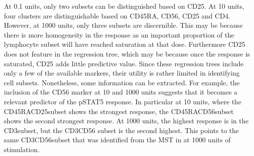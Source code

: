 At 0.1 units, only two subsets can be distinguished based on CD25.  
At 10 units, four clusters are distinguishable based on CD45RA, CD56, CD25 and CD4.
However, at 1000 units, only three subsets are discernible.
This may be because there is more homogeneity in the response as
an important proportion of the lymphocyte subset will have reached saturation at that dose.
Furthermore CD25 does not feature in the regression tree,
which may be because once the response is saturated, CD25 adds little predictive value.
Since these regression trees include only a few of the available markers, their utility is rather limited in
identifying cell subsets.
Nonetheless, some information can be extracted.
For example, the inclusion of the CD56 marker at 10 and 1000 units suggests that it becomes a relevant predictor of the pSTAT5 response.
In particular at 10 units, where the CD45RA\negative CD25\positive subset shows the strongest response,
the CD45RA\positive CD56\high subset shows the second strongest response.
At 1000 units, the highest response is in the CD3\positive subset, but the CD3\negative CD56\positive
subset is the second highest.
This points to the same CD3\negative CD56\positive subset that was identified from the \gls{MST} in  at 1000 units of stimulation.

